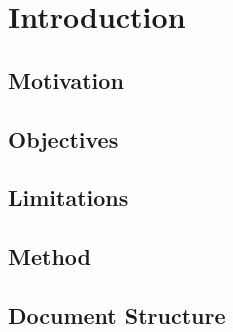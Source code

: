 \chapter{Introduction}

\section{Motivation}

\section{Objectives}


\section{Limitations}

\section{Method}

\section{Document Structure}

